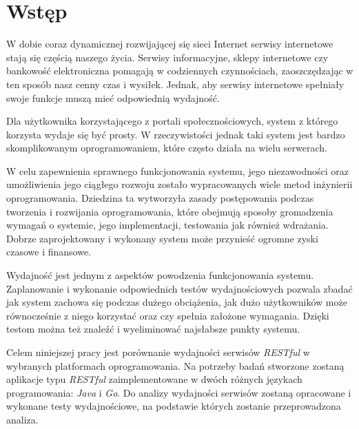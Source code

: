 \chapter{Wstęp}

W dobie coraz dynamicznej rozwijającej się sieci Internet serwisy internetowe stają się częścią  naszego życia. Serwisy informacyjne, sklepy internetowe czy bankowość elektroniczna pomagają w codziennych czynnościach,  zaoszczędzając w ten sposób nasz cenny czas i wysiłek. Jednak, aby  serwisy internetowe spełniały swoje funkcje muszą  mieć odpowiednią wydajność. 

Dla użytkownika korzystającego z portali społecznościowych, system z którego korzysta wydaje się być prosty. W rzeczywistości jednak taki system jest bardzo skomplikowanym oprogramowaniem, które często działa na wielu serwerach.

W celu zapewnienia sprawnego funkcjonowania  systemu, jego niezawodności oraz umożliwienia jego ciągłego rozwoju zostało wypracowanych wiele metod inżynierii oprogramowania. Dziedzina ta wytworzyła zasady postępowania podczas tworzenia i rozwijania oprogramowania, które obejmują sposoby gromadzenia wymagań o systemie, jego implementacji, testowania jak również wdrażania. Dobrze zaprojektowany i wykonany system może przynieść ogromne zyski czasowe i finansowe. 

Wydajność jest jednym z aspektów powodzenia funkcjonowania systemu. Zaplanowanie i wykonanie odpowiednich testów wydajnościowych pozwala zbadać jak system zachowa się podczas dużego obciążenia, jak dużo użytkowników może równocześnie z niego korzystać oraz czy spełnia założone wymagania. Dzięki testom można też znaleźć i wyeliminować najsłabsze punkty systemu.

Celem niniejszej pracy jest  porównanie wydajności serwisów  \textsl{RESTful} w wybranych platformach oprogramowania. Na potrzeby badań  stworzone zostaną aplikacje typu \textsl{RESTful} zaimplementowane  w dwóch różnych językach programowania: \textsl{Java} i \textsl{Go}.  Do analizy wydajności serwisów zostaną opracowane i wykonane testy wydajnościowe, na podstawie których zostanie przeprowadzona analiza.
